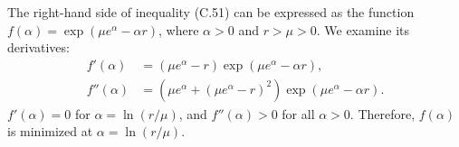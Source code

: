 The right-hand side of inequality (C.51) can be expressed as the function $f(\alpha)=\exp(\mu e^\alpha-\alpha r)$, where $\alpha>0$ and $r>\mu>0$.
We examine its derivatives:
\begin{align*}
    f'(\alpha) &= (\mu e^\alpha-r)\exp(\mu e^\alpha-\alpha r), \\
    f''(\alpha) &= \left(\mu e^\alpha+(\mu e^\alpha-r)^2\right)\exp(\mu e^\alpha-\alpha r).
\end{align*}
$f'(\alpha)=0$ for $\alpha=\ln(r/\mu)$, and $f''(\alpha)>0$ for all $\alpha>0$.
Therefore, $f(\alpha)$ is minimized at $\alpha=\ln(r/\mu)$.
